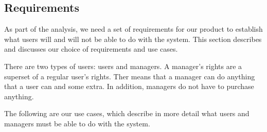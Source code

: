 \subsection{Requirements}
As part of the analysis, we need a set of requirements for our product to establish what users will and will not be able to do with the system. This section describes and discusses our choice of requirements and use cases.


There are two types of users: users and managers. A manager’s rights are a superset of a regular user’s rights. Ther means that a manager can do anything that a user can and some extra. In addition, managers do not have to purchase anything.


The following are our use cases, which describe in more detail what users and managers must be able to do with the system.

